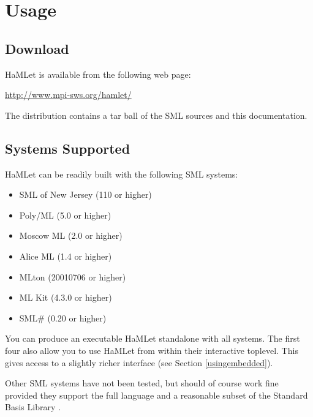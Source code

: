 \documentclass[twoside,titlepage]{article}
\begin{document}
\section{Usage}
\label{usage}

\subsection{Download}
\label{download}

HaMLet is available from the following web page:

\begin{quoting}
\url{http://www.mpi-sws.org/hamlet/}
\end{quoting}

The distribution contains a tar ball of the SML sources and this documentation.


\subsection{Systems Supported}
\label{systems}

HaMLet can be readily built with the following SML systems:

\begin{itemize}[nolistsep]
\item SML of New Jersey (110 or higher) \cite{smlnj}
\item Poly/ML (5.0 or higher) \cite{polyml}
\item Moscow ML (2.0 or higher) \cite{mosml}
\item Alice ML (1.4 or higher) \cite{alice}
\item MLton (20010706 or higher) \cite{mlton}
\item ML Kit (4.3.0 or higher) \cite{mlkit}
\item SML\# (0.20 or higher) \cite{smlsharp}
\end{itemize}

You can produce an executable HaMLet standalone with all systems. The first four also allow you to use HaMLet from within their interactive toplevel. This gives access to a slightly richer interface (see Section \ref{usingembedded}).

Other SML systems have not been tested, but should of course work fine provided they support the full language and a reasonable subset of the Standard Basis Library \cite{basis}.
\end{document}
